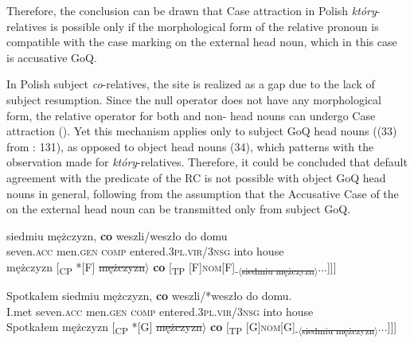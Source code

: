 \documentclass[output=paper]{langsci/langscibook}
\begin{document}
Therefore, the conclusion can be drawn that Case attraction in Polish \textit{który}{}-relatives is possible only if the morphological form of the relative pronoun is compatible with the case marking on the external head noun, which in this case is accusative GoQ. 

In Polish subject \textit{co}{}-relatives, the  site is realized as a gap due to the lack of subject resumption. Since the null operator does not have any morphological form, the relative operator for both  and non- head nouns can undergo Case attraction (\citealt{Łęska2016}). Yet this mechanism applies only to subject GoQ head nouns ((33) from \citealt{Łęska2016}: 131), as opposed to object head nouns (34), which patterns with the observation made for \textit{który}{}-relatives. Therefore, it could be concluded that default agreement with the predicate of the RC is not possible with object GoQ head nouns in general, following from the assumption that the Accusative Case of the  on the external head noun can be transmitted only from subject GoQ.
 
\ea%
    \label{ex:leska:33}
    \gll siedmiu   mężczyzn,   \textbf{co}   weszli/weszło     do   domu\\
         seven.\textsc{acc}   men.\textsc{gen}   \textsc{comp}   entered.\textsc{3pl.vir}/\textsc{3nsg} into   house \\
    \glt {} mężczyzn [\textsubscript{CP} *[F]\sout{ mężczyzn}$\rangle$ \textbf{co} [\textsubscript{TP} [F]{\footnotesize\textsc{nom}}\relax [\textsubscript{vP} \ConnectHead[7ex]{t\textsubscript{Op}}[F]\textsubscript{-$\langle$\sout{siedmiu mężczyzn}$\rangle$}...]]]
\z

\ea%
    \label{ex:leska:34}
    \gll Spotkałem   siedmiu   mężczyzn,   \textbf{co}   weszli/*weszło do   domu.\\
         I.met     seven.\textsc{acc}   men.\textsc{gen}   \textsc{comp} entered.\textsc{3pl.vir}/\textsc{3nsg} into   house\\
    \glt Spotkałem  mężczyzn [\textsubscript{CP} *[G]\sout{ mężczyzn}$\rangle$ \textbf{co} [\textsubscript{TP} [G]{\footnotesize\textsc{nom}}\relax [\textsubscript{vP} \ConnectHead[7ex]{t\textsubscript{Op}}[G]\textsubscript{-$\langle$\sout{siedmiu mężczyzn}$\rangle$}...]]]
\z
\end{document}
